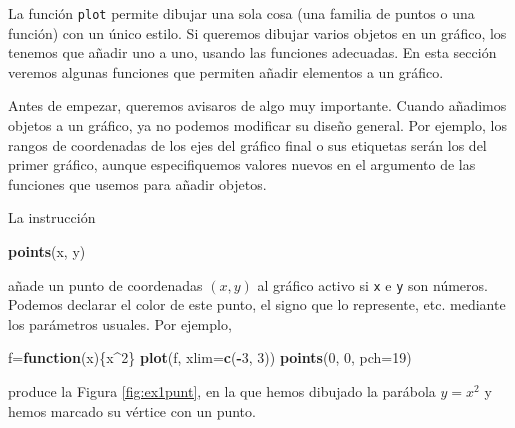 \documentclass[
]{book}
\newenvironment{Shaded}{\begin{snugshade}}{\end{snugshade}}
\newcommand{\ControlFlowTok}[1]{\textcolor[rgb]{0.13,0.29,0.53}{\textbf{#1}}}
\newcommand{\DataTypeTok}[1]{\textcolor[rgb]{0.13,0.29,0.53}{#1}}
\newcommand{\DecValTok}[1]{\textcolor[rgb]{0.00,0.00,0.81}{#1}}
\newcommand{\KeywordTok}[1]{\textcolor[rgb]{0.13,0.29,0.53}{\textbf{#1}}}
\newcommand{\NormalTok}[1]{#1}
\newcommand{\OperatorTok}[1]{\textcolor[rgb]{0.81,0.36,0.00}{\textbf{#1}}}
\theoremstyle{definition}
\theoremstyle{definition}
\theoremstyle{definition}
\theoremstyle{remark}
\begin{document}
La función \texttt{plot} permite dibujar una sola cosa (una familia de puntos o una función) con un único estilo. Si queremos dibujar varios objetos en un gráfico, los tenemos que añadir uno a uno, usando las funciones adecuadas. En esta sección veremos algunas funciones que permiten añadir elementos a un gráfico.

Antes de empezar, queremos avisaros de algo muy importante. Cuando añadimos objetos a un gráfico, ya no podemos modificar su diseño general. Por ejemplo, los rangos de coordenadas de los ejes del gráfico final o sus etiquetas serán los del primer gráfico, aunque especifiquemos valores nuevos en el argumento de las funciones que usemos para añadir objetos.

La instrucción

\begin{Shaded}
\begin{Highlighting}[]
\KeywordTok{points}\NormalTok{(x, y)}
\end{Highlighting}
\end{Shaded}

añade un punto de coordenadas \((x, y)\) al gráfico activo si \texttt{x} e \texttt{y} son números. Podemos declarar el color de este punto, el signo que lo represente, etc. mediante los parámetros usuales. Por ejemplo,

\begin{Shaded}
\begin{Highlighting}[]
\NormalTok{f=}\ControlFlowTok{function}\NormalTok{(x)\{x}\OperatorTok{\^{}}\DecValTok{2}\NormalTok{\}}
\KeywordTok{plot}\NormalTok{(f, }\DataTypeTok{xlim=}\KeywordTok{c}\NormalTok{(}\OperatorTok{{-}}\DecValTok{3}\NormalTok{, }\DecValTok{3}\NormalTok{))}
\KeywordTok{points}\NormalTok{(}\DecValTok{0}\NormalTok{, }\DecValTok{0}\NormalTok{, }\DataTypeTok{pch=}\DecValTok{19}\NormalTok{)}
\end{Highlighting}
\end{Shaded}

produce la Figura \ref{fig:ex1punt}, en la que hemos dibujado la parábola \(y=x^2\) y hemos marcado su vértice con un punto.
\end{document}
